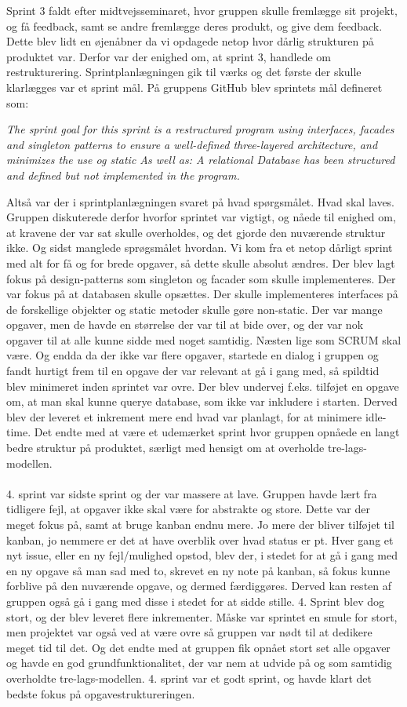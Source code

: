 Sprint 3 faldt efter midtvejsseminaret, hvor gruppen skulle fremlægge sit projekt, og få feedback, samt se andre fremlægge deres produkt, og give dem feedback. Dette blev lidt en øjenåbner da vi opdagede netop hvor dårlig strukturen på produktet var. Derfor var der enighed om, at sprint 3, handlede om restrukturering. Sprintplanlægningen gik til værks og det første der skulle klarlægges var et sprint mål. På gruppens GitHub blev sprintets mål defineret som: 

\textit{The sprint goal for this sprint is a restructured program using interfaces, facades and singleton patterns to ensure a well-defined three-layered architecture, and minimizes the use og static
As well as:
A relational Database has been structured and defined but not implemented in the program.}

Altså var der i sprintplanlægningen svaret på hvad spørgsmålet. Hvad skal laves. Gruppen diskuterede derfor hvorfor sprintet var vigtigt, og nåede til enighed om, at kravene der var sat skulle overholdes, og det gjorde den nuværende struktur ikke. Og sidst manglede sprøgsmålet hvordan. Vi kom fra et netop dårligt sprint med alt for få og for brede opgaver, så dette skulle absolut ændres. Der blev lagt fokus på design-patterns som singleton og facader som skulle implementeres. Der var fokus på at databasen skulle opsættes. Der skulle implementeres interfaces på de forskellige objekter og static metoder skulle gøre non-static. Der var mange opgaver, men de havde en størrelse der var til at bide over, og der var nok opgaver til at alle kunne sidde med noget samtidig. Næsten lige som SCRUM skal være. Og endda da der ikke var flere opgaver, startede en dialog i gruppen og fandt hurtigt frem til en opgave der var relevant at gå i gang med, så spildtid blev minimeret inden sprintet var ovre. Der blev undervej f.eks. tilføjet en opgave om, at man skal kunne querye database, som ikke var inkludere i starten. Derved blev der leveret et inkrement mere end hvad var planlagt, for at minimere idle-time. Det endte med at være et udemærket sprint hvor gruppen opnåede en langt bedre struktur på produktet, særligt med hensigt om at overholde tre-lags-modellen.\\\\
4. sprint var sidste sprint og der var massere at lave. Gruppen havde lært fra tidligere fejl, at opgaver ikke skal være for abstrakte og store. Dette var der meget fokus på, samt at bruge kanban endnu mere. Jo mere der bliver tilføjet til kanban, jo nemmere er det at have overblik over hvad status er pt. Hver gang et nyt issue, eller en ny fejl/mulighed opstod, blev der, i stedet for at gå i gang med en ny opgave så man sad med to, skrevet en ny note på kanban, så fokus kunne forblive på den nuværende opgave, og dermed færdiggøres. Derved kan resten af gruppen også gå i gang med disse i stedet for at sidde stille. 4. Sprint blev dog stort, og der blev leveret flere inkrementer. Måske var sprintet en smule for stort, men projektet var også ved at være ovre så gruppen var nødt til at dedikere meget tid til det. Og det endte med at gruppen fik opnået stort set alle opgaver og havde en god grundfunktionalitet, der var nem at udvide på og som samtidig overholdte tre-lags-modellen. 4. sprint var et godt sprint, og havde klart det bedste fokus på opgavestruktureringen.
